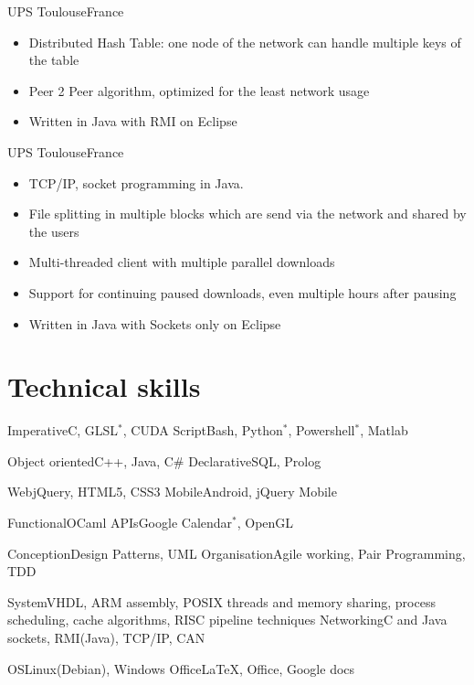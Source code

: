 \documentclass[a4paper,11pt]{moderncv}
\begin{document}
{UPS Toulouse}{France}
{
    \begin{itemize}
        \item Distributed Hash Table: one node of the network can handle multiple keys of the table
        \item Peer 2 Peer algorithm, optimized for the least network usage
        \item Written in Java with RMI on Eclipse
    \end{itemize}
}

{UPS Toulouse}{France}
{
    \begin{itemize}
        \item TCP/IP, socket programming in Java.
        \item File splitting in multiple blocks which are send via the network and shared by the users
        \item Multi-threaded client with multiple parallel downloads
        \item Support for continuing paused downloads, even multiple hours after pausing
        \item Written in Java with Sockets only on Eclipse
    \end{itemize}
}

\section{Technical skills}
\cvdoubleitem
{Imperative}{C, GLSL$^*$, CUDA}
{Script}{Bash, Python$^*$, Powershell$^*$, Matlab}

\cvdoubleitem
{Object oriented}{C++, Java, C\#}
{Declarative}{SQL, Prolog}

\cvdoubleitem
{Web}{jQuery, HTML5, CSS3}
{Mobile}{Android, jQuery Mobile}

\cvdoubleitem
{Functional}{OCaml}
{APIs}{Google Calendar$^*$, OpenGL}

\cvdoubleitem
{Conception}{Design Patterns, UML}
{Organisation}{Agile working, Pair Programming, TDD}

\cvdoubleitem
{System}{VHDL, ARM assembly, POSIX threads and memory sharing, process scheduling, cache algorithms, RISC pipeline techniques}
{Networking}{C and Java sockets, RMI(Java), TCP/IP, CAN}

\cvdoubleitem
{OS}{Linux(Debian), Windows}
{Office}{LaTeX, Office, Google docs}
\end{document}

